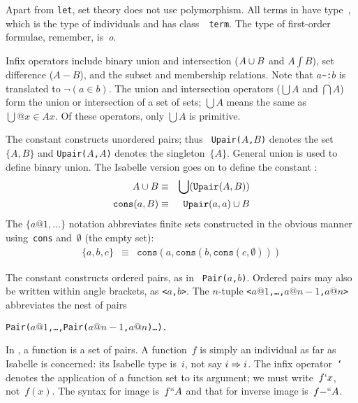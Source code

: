 Apart from \texttt{let}, set theory does not use polymorphism.  All terms in
{\ZF} have type~, which is the type of individuals and has class~{\tt
  term}.  The type of first-order formulae, remember, is~\textit{o}.

Infix operators include binary union and intersection ($A\cup B$ and
$A\int B$), set difference ($A-B$), and the subset and membership
relations.  Note that $a$\verb|~:|$b$ is translated to $\neg(a\in b)$.  The
union and intersection operators ($\bigcup A$ and $\bigcap A$) form the
union or intersection of a set of sets; $\bigcup A$ means the same as
$\bigcup@{x\in A}x$.  Of these operators, only $\bigcup A$ is primitive.

The constant  constructs unordered pairs; thus {\tt
  Upair($A$,$B$)} denotes the set~$\{A,B\}$ and \texttt{Upair($A$,$A$)}
denotes the singleton~$\{A\}$.  General union is used to define binary
union.  The Isabelle version goes on to define the constant
:
\begin{eqnarray*}
   A\cup B              & \equiv &       \bigcup(\texttt{Upair}(A,B)) \\
   \texttt{cons}(a,B)      & \equiv &        \texttt{Upair}(a,a) \cup B
\end{eqnarray*}
The $\{a@1, \ldots\}$ notation abbreviates finite sets constructed in the
obvious manner using~\texttt{cons} and~$\emptyset$ (the empty set):
\begin{eqnarray*}
 \{a,b,c\} & \equiv & \texttt{cons}(a,\texttt{cons}(b,\texttt{cons}(c,\emptyset)))
\end{eqnarray*}

The constant  constructs ordered pairs, as in {\tt
Pair($a$,$b$)}.  Ordered pairs may also be written within angle brackets,
as {\tt<$a$,$b$>}.  The $n$-tuple {\tt<$a@1$,\ldots,$a@{n-1}$,$a@n$>}
abbreviates the nest of pairs\par\nobreak
\centerline\texttt{Pair($a@1$,\ldots,Pair($a@{n-1}$,$a@n$)\ldots).}

In {\ZF}, a function is a set of pairs.  A {\ZF} function~$f$ is simply an
individual as far as Isabelle is concerned: its Isabelle type is~$i$, not
say $i\Rightarrow i$.  The infix operator~{\tt`} denotes the application of a
function set to its argument; we must write~$f{\tt`}x$, not~$f(x)$.  The
syntax for image is~$f{\tt``}A$ and that for inverse image is~$f{\tt-``}A$.


